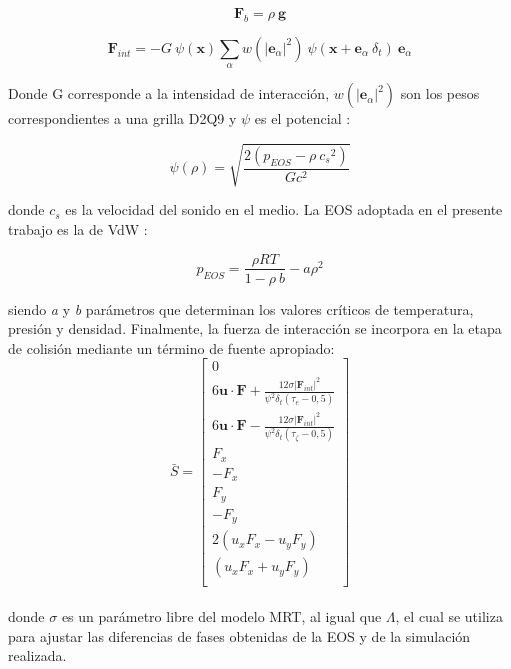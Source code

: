 \begin{equation}
	{\mathbf{F}}_{b} = \rho \> \mathbf{g}
	\label{eq:Fb}
\end{equation}


\begin{equation}
{\mathbf{F}}_{int} = - G \> \psi(\mathbf{x}) \sum_{\alpha}^{} w({|{\mathbf{e}}_{\alpha}|}^{2}) \> \psi (\mathbf{x} + {\mathbf{e}}_{\alpha} \> \delta_{t}) \> {\mathbf{e}}_{\alpha} 
\label{eq:fint}
\end{equation}

Donde G corresponde a la intensidad de interacción, $w({|{\mathbf{e}}_{\alpha}|}^{2})$ son los pesos correspondientes a una grilla D2Q9 y $\psi$ es el potencial :

\begin{equation} 
    \psi(\rho) = \sqrt{\frac{2 (p_{EOS} - \rho \> {c_{s}}^{2})}{G {c}^{2}}}
    \label{eq:psi}
\end{equation}

donde $c_{s}$ es la velocidad del sonido en el medio. La EOS adoptada en el presente trabajo es la de VdW :

\begin{equation}
    p_{EOS} = \frac{\rho R T}{1- \rho \> b} - a {\rho}^{2}
    \label{eq:rho_eos}
\end{equation}

siendo \textit{a} y \textit{b} parámetros que determinan los valores críticos de temperatura, presión y densidad. Finalmente, la fuerza de interacción se incorpora en la etapa de colisión mediante un término de fuente apropiado:
\begin{equation}
    \bar{S} = 
    \left[ \begin{array}{c} 
        0\\
        6 \mathbf{u}\cdot \mathbf{F} + \frac{12 \sigma {|{\mathbf{F}_{int}|}}^{2} }{{\psi}^{2} \delta_{t} (\tau_{e} - 0,5)}\\
        6 \mathbf{u}\cdot \mathbf{F} - \frac{12 \sigma {|{\mathbf{F}_{int}|}}^{2} }{{\psi}^{2} \delta_{t} (\tau_{\zeta } - 0,5)}\\
        F_{x}\\
        -F_{x}\\
        F_{y}\\
        -F_{y}\\
        2(u_{x} F_{x} - u_{y} F_{y} )\\
        (u_{x} F_{x} + u_{y} F_{y} )\\              
    \end{array}
    \right]    
    \label{eq:termino_fuente_s}
\end{equation}
\\
donde $\sigma$ es un parámetro libre del modelo MRT, al igual que $\Lambda$, el cual se utiliza para ajustar las diferencias de fases obtenidas de la EOS y de la simulación realizada.


